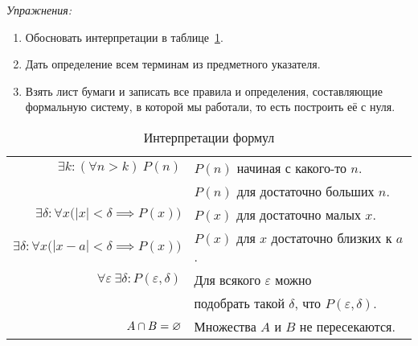 \vspace{1em}
{\it Упражнения:}
\begin{enumerate}
	\item{}Обосновать интерпретации в таблице~\ref{table:formula_interp}.
	\item{}Дать определение всем терминам из предметного указателя.
	\item{}Взять лист бумаги и записать все правила и определения, составляющие
	формальную систему, в которой мы работали, то есть построить её с нуля.
\end{enumerate}

\begin{table}
	\centering
	\begin{tabular}{r|l}
		$\exists k:(\forall n>k)~P(n)$        & $P(n)$ начиная с какого-то $n$.      \\
		                                      & $P(n)$ для достаточно больших $n$.   \\[1em]

		$\exists \delta:\forall x
		\big(|x|<\delta\implies P(x)\big)$    & $P(x)$ для достаточно малых $x$.     \\[1em]

		$\exists \delta:\forall x
			\big(|x-a|<\delta\implies
		P(x)\big)$                            & $P(x)$ для $x$
		достаточно близких к $a$.                                                    \\[1em]

		$\forall \varepsilon~
		\exists \delta:P(\varepsilon,\delta)$ & Для всякого $\varepsilon$ можно      \\
		                                      & подобрать такой $\delta$,
		что $P(\varepsilon,\delta)$.                                                 \\[1em]

		$A\cap B=\varnothing$                       & Множества $A$ и $B$ не пересекаются.
	\end{tabular}
	\caption{Интерпретации формул}\label{table:formula_interp}
\end{table}

\vspace{1em}

